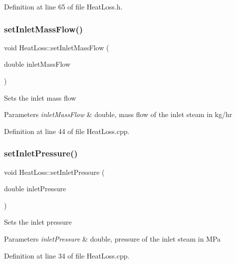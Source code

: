 Definition at line 65 of file Heat\+Loss.\+h.

\mbox{\label{class_heat_loss_ac4154dc9922b6ddf3f2e7a10cc64c61f}} 
\subsubsection{\texorpdfstring{set\+Inlet\+Mass\+Flow()}{setInletMassFlow()}}
{\footnotesize\ttfamily void Heat\+Loss\+::set\+Inlet\+Mass\+Flow (\begin{DoxyParamCaption}\item[{double}]{inlet\+Mass\+Flow }\end{DoxyParamCaption})}

Sets the inlet mass flow 
\begin{DoxyParams}{Parameters}
{\em inlet\+Mass\+Flow} & double, mass flow of the inlet steam in kg/hr \\
\hline
\end{DoxyParams}


Definition at line 44 of file Heat\+Loss.\+cpp.

\mbox{\label{class_heat_loss_ab0a6b1f2a964d161d25758318f25f7e3}} 
\subsubsection{\texorpdfstring{set\+Inlet\+Pressure()}{setInletPressure()}}
{\footnotesize\ttfamily void Heat\+Loss\+::set\+Inlet\+Pressure (\begin{DoxyParamCaption}\item[{double}]{inlet\+Pressure }\end{DoxyParamCaption})}

Sets the inlet pressure 
\begin{DoxyParams}{Parameters}
{\em inlet\+Pressure} & double, pressure of the inlet steam in M\+Pa \\
\hline
\end{DoxyParams}


Definition at line 34 of file Heat\+Loss.\+cpp.

\mbox{\label{class_heat_loss_a2a4a80b16c1f975e194ae466b20d46bd}} 
